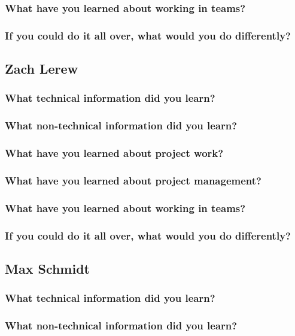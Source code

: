 \documentclass[onecolumn, draftclsnofoot,10pt, compsoc]{IEEEtran}
\begin{document}
			\subsubsection{What have you learned about working in teams?}
			\subsubsection{If you could do it all over, what would you do differently?}
		\subsection{Zach Lerew}
			\subsubsection{What technical information did you learn?}
			\subsubsection{What non-technical information did you learn?}
			\subsubsection{What have you learned about project work?}
			\subsubsection{What have you learned about project management?}
			\subsubsection{What have you learned about working in teams?}
			\subsubsection{If you could do it all over, what would you do differently?}
		\subsection{Max Schmidt}
			\subsubsection{What technical information did you learn?}
			\subsubsection{What non-technical information did you learn?}
\end{document}

